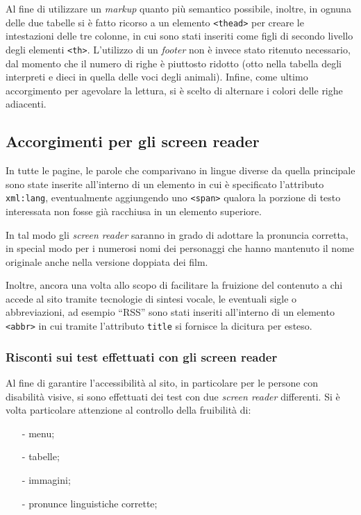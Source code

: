 \documentclass[10pt,a4paper,onecolumn]{article}
\newcommand{\inglese}[1]{\foreignlanguage{english}{\itshape{}#1}}
\begin{document}
Al fine di utilizzare un \inglese{markup} quanto più semantico possibile, inoltre, in ognuna delle due tabelle si è fatto ricorso a un elemento \texttt{<thead>} per creare le intestazioni delle tre colonne, in cui sono stati inseriti come figli di secondo livello degli elementi \texttt{<th>}. L'utilizzo di un \inglese{footer} non è invece stato ritenuto necessario, dal momento che il numero di righe è piuttosto ridotto (otto nella tabella degli interpreti e dieci in quella delle voci degli animali). Infine, come ultimo accorgimento per agevolare la lettura, si è scelto di alternare i colori delle righe adiacenti.

\subsection{Accorgimenti per gli screen reader}
In tutte le pagine, le parole che comparivano in lingue diverse da quella principale sono state inserite all'interno di un elemento in cui è specificato l'attributo \texttt{xml:lang}, eventualmente aggiungendo uno \texttt{<span>} qualora la porzione di testo interessata non fosse già racchiusa in un elemento superiore.

In tal modo gli \inglese{screen reader} saranno in grado di adottare la pronuncia corretta, in special modo per i numerosi nomi dei personaggi che hanno mantenuto il nome originale anche nella versione doppiata dei film.

Inoltre, ancora una volta allo scopo di facilitare la fruizione del contenuto a chi accede al sito tramite tecnologie di sintesi vocale, le eventuali sigle o abbreviazioni, ad esempio ``RSS'' sono stati inseriti all'interno di un elemento \texttt{<abbr>} in cui tramite l'attributo \texttt{title} si fornisce la dicitura per esteso.
\subsubsection{Risconti sui test effettuati con gli screen reader}
Al fine di garantire l'accessibilità al sito, in particolare per le persone con disabilità visive, si sono effettuati dei test con due  \inglese{screen reader} differenti. 
Si è volta particolare attenzione al controllo della fruibilità di:
\begin{itemize}[noitemsep,nolistsep]
  \item[-] menu;
  \item[-] tabelle;
  \item[-] immagini;
  \item[-] pronunce linguistiche corrette;
\end{itemize}
\end{document}
